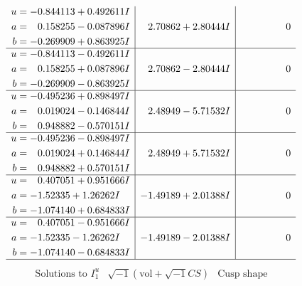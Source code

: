 \documentclass[1p]{elsarticle_modified}
\theoremstyle{definition}
\newcommand{\I}{\sqrt{-1}}
\begin{document}
$$\begin{array}{c|c|c}
\begin{aligned}
u &= -0.844113 + 0.492611 I \\
a &= \phantom{-}0.158255 - 0.087896 I \\
b &= -0.269909 + 0.863925 I\end{aligned}
 & \phantom{-}2.70862 + 2.80444 I & \phantom{-0.000000 } 0 \\ \hline\begin{aligned}
u &= -0.844113 - 0.492611 I \\
a &= \phantom{-}0.158255 + 0.087896 I \\
b &= -0.269909 - 0.863925 I\end{aligned}
 & \phantom{-}2.70862 - 2.80444 I & \phantom{-0.000000 } 0 \\ \hline\begin{aligned}
u &= -0.495236 + 0.898497 I \\
a &= \phantom{-}0.019024 - 0.146844 I \\
b &= \phantom{-}0.948882 - 0.570151 I\end{aligned}
 & \phantom{-}2.48949 - 5.71532 I & \phantom{-0.000000 } 0 \\ \hline\begin{aligned}
u &= -0.495236 - 0.898497 I \\
a &= \phantom{-}0.019024 + 0.146844 I \\
b &= \phantom{-}0.948882 + 0.570151 I\end{aligned}
 & \phantom{-}2.48949 + 5.71532 I & \phantom{-0.000000 } 0 \\ \hline\begin{aligned}
u &= \phantom{-}0.407051 + 0.951666 I \\
a &= -1.52335 + 1.26262 I \\
b &= -1.074140 + 0.684833 I\end{aligned}
 & -1.49189 + 2.01388 I & \phantom{-0.000000 } 0 \\ \hline\begin{aligned}
u &= \phantom{-}0.407051 - 0.951666 I \\
a &= -1.52335 - 1.26262 I \\
b &= -1.074140 - 0.684833 I\end{aligned}
 & -1.49189 - 2.01388 I & \phantom{-0.000000 } 0\\
 \hline 
 \end{array}$$\newpage$$\begin{array}{c|c|c}  
\text{Solutions to }I^u_{1}& \I (\text{vol} + \sqrt{-1}CS) & \text{Cusp shape}\\
 \hline 
\begin{aligned}

\end{aligned}
\end{array}$$
\end{document}
